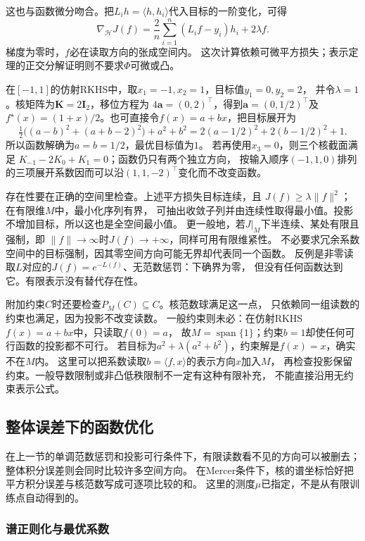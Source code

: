 这也与函数微分吻合。把$L_i h=\langle h,h_i\rangle$代入目标的一阶变化，可得
\[
 \nabla_{\mathcal H}J(f)
 =\frac2n\sum_{i=1}^n(L_if-y_i)h_i+2\lambda f.
\]
梯度为零时，$f$必在读取方向的张成空间内。
这次计算依赖可微平方损失；表示定理的正交分解证明则不要求$\Phi$可微或凸。

\begin{example}[两个点值的有限求解]
\label{ex:functional-two-readings}
在$[-1,1]$的仿射RKHS中，取$x_1=-1,x_2=1$，目标值$y_1=0,y_2=2$，
并令$\lambda=1$。核矩阵为$\bm K=2\bm I_2$，移位方程为
$4\bm a=(0,2)^\top$，得到$\bm a=(0,1/2)^\top$及
$f^\star(x)=(1+x)/2$。也可直接令$f(x)=a+bx$，把目标展开为
\[
 \tfrac12\bigl((a-b)^2+(a+b-2)^2\bigr)+a^2+b^2
 =2(a-1/2)^2+2(b-1/2)^2+1.
\]
所以函数解确为$a=b=1/2$，最优目标值为$1$。
若再使用$x_3=0$，则三个核截面满足
$K_{-1}-2K_0+K_1=0$；函数仍只有两个独立方向，
按输入顺序$(-1,1,0)$排列的三项展开系数因而可以沿$(1,1,-2)^\top$变化而不改变函数。
\end{example}

存在性要在正确的空间里检查。上述平方损失目标连续，且
$J(f)\geq\lambda\lVert f\rVert^2$；在有限维$M$中，最小化序列有界，
可抽出收敛子列并由连续性取得最小值。投影不增加目标，所以这也是全空间最小值。
更一般地，若$J|_M$下半连续、某处有限且强制，即
$\lVert f\rVert\to\infty$时$J(f)\to+\infty$，同样可用有限维紧性。
不必要求冗余系数空间中的目标强制，因其零空间方向可能无界却代表同一个函数。
反例是非零读取$L$对应的$J(f)=e^{-L(f)}$、无范数惩罚：下确界为零，
但没有任何函数达到它。有限表示没有替代存在性。

附加约束$C$时还要检查$P_M(C)\subseteq C$。核范数球满足这一点，
只依赖同一组读数的约束也满足，因为投影不改变读数。
一般约束则未必：在仿射RKHS$f(x)=a+bx$中，只读取$f(0)=a$，
故$M=\operatorname{span}\{1\}$；约束$b=1$却使任何可行函数的投影都不可行。
若目标为$a^2+\lambda(a^2+b^2)$，约束解是$f(x)=x$，确实不在$M$内。
这里可以把系数读取$b=\langle f,x\rangle$的表示方向$x$加入$M$，
再检查投影保留约束。一般导数限制或非凸低秩限制不一定有这种有限补充，
不能直接沿用无约束表示公式。

\subsection{整体误差下的函数优化}

在上一节的单调范数惩罚和投影可行条件下，有限读数看不见的方向可以被删去；
整体积分误差则会同时比较许多空间方向。
在Mercer条件下，核的谱坐标恰好把平方积分误差与核范数写成可逐项比较的和。
这里的测度$\mu$已指定，不是从有限训练点自动得到的。

\subsubsection{谱正则化与最优系数}

